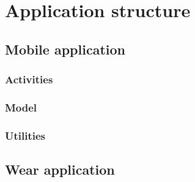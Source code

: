 \section{Application structure}
\label{sec:ApplicationStructure}

\subsection{Mobile application}
\label{subsec:MobileApplication}

\subsubsection{Activities}
\label{subsec:Activities}

\subsubsection{Model}
\label{subsec:Model}

\subsubsection{Utilities}
\label{subsec:Utilities}

\subsection{Wear application}
\label{subsec:WearApplication}